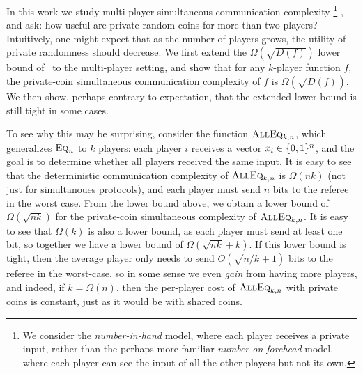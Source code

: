 In this work we study multi-player simultaneous communication complexity%
\footnote{We consider the \emph{number-in-hand} model, where each player receives a private input, rather than the perhaps
more familiar \emph{number-on-forehead} model, where each player can see the input of all the other players but not its own.}%
, and ask: how useful are private random coins for more than two players? Intuitively, one might expect that as the number of players grows, the utility of private randomness should decrease.
%
%
We first extend the $\Omega(\sqrt{D(f)})$ lower bound of~\cite{BK97} to the multi-player setting, and show that for any $k$-player function $f$,
the private-coin simultaneous communication complexity of $f$ is $\Omega(\sqrt{D(f)})$.
We then show, perhaps contrary to expectation, that the extended lower
bound is still tight in some cases.

To see why this may be surprising, consider the function $\text{\textsc{AllEq}}_{k,n}$, which generalizes $\text{\textsc{Eq}}_n$ to $k$ players: each player $i$ receives a vector $x_i \in \{ 0,1 \}^n$, and the goal is to determine whether all players received the same input. It is easy to see that the deterministic communication complexity of $\text{\textsc{AllEq}}_{k,n}$ is $\Omega(nk)$ (not just for simultanoues protocols), and each player must send $n$ bits to the referee in the worst case. From the lower bound above, we obtain a lower bound of $\Omega(\sqrt{nk})$ for the private-coin simultaneous complexity of $\text{\textsc{AllEq}}_{k,n}$.
It is easy to see that $\Omega(k)$ is also a lower bound, as each player must send at least one bit, so together we have a lower bound of $\Omega(\sqrt{nk}+k)$.
If this lower bound is tight, then the average player only needs to send $O(\sqrt{n/k}+1)$ bits to the referee in the worst-case, so in some sense we even \emph{gain} from having more players, and indeed, if $k = \Omega(n)$, then the per-player cost of $\text{\textsc{AllEq}}_{k,n}$ with private coins is constant, just as it would be with shared coins.


